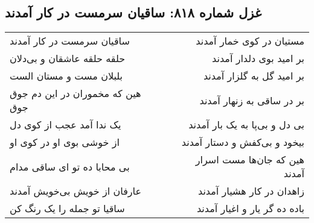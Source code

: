 \begin{center}
\section*{غزل شماره ۸۱۸: ساقیان سرمست در کار آمدند}
\label{sec:0818}
\begin{longtable}{l p{0.5cm} r}
ساقیان سرمست در کار آمدند
&&
مستیان در کوی خمار آمدند
\\
حلقه حلقه عاشقان و بی‌دلان
&&
بر امید بوی دلدار آمدند
\\
بلبلان مست و مستان الست
&&
بر امید گل به گلزار آمدند
\\
هین که مخموران در این دم جوق جوق
&&
بر در ساقی به زنهار آمدند
\\
یک ندا آمد عجب از کوی دل
&&
بی دل و بی‌پا به یک بار آمدند
\\
از خوشی بوی او در کوی او
&&
بیخود و بی‌کفش و دستار آمدند
\\
بی محابا ده تو ای ساقی مدام
&&
هین که جان‌ها مست اسرار آمدند
\\
عارفان از خویش بی‌خویش آمدند
&&
زاهدان در کار هشیار آمدند
\\
ساقیا تو جمله را یک رنگ کن
&&
باده ده گر یار و اغیار آمدند
\\
\end{longtable}
\end{center}
